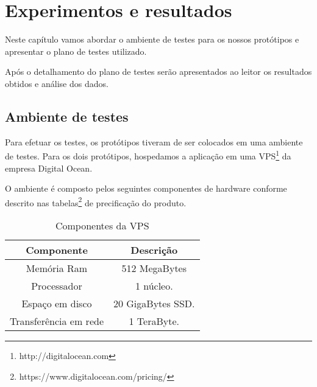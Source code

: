
\chapter{Experimentos e resultados}
\label{experimentos-resultados}

\vspace{-1.9cm}


 Neste capítulo vamos abordar o ambiente de testes para os nossos protótipos e apresentar 
 o plano de testes utilizado.
 
 Após o detalhamento do plano de testes serão apresentados ao leitor os resultados obtidos e análise dos dados.

\section{Ambiente de testes}
\label{ambientedetestes}

  Para efetuar os testes, os protótipos tiveram de ser colocados em uma ambiente de testes. 
  Para os dois protótipos, hospedamos a aplicação em uma VPS\footnote{http://digitalocean.com} da empresa Digital Ocean.
  
  O ambiente é composto pelos seguintes componentes de hardware conforme descrito nas tabelas\footnote{https://www.digitalocean.com/pricing/}
  de precificação do produto.
  
  \begin{table}[H]
    \centering
    \footnotesize
    \setlength{\abovecaptionskip}{0pt}
    \setlength{\belowcaptionskip}{0pt}
    \caption[Componentes da VPS]{Componentes da VPS}
    \label{tab:components-digital-ocean-vps}
    \begin{tabular}{c|c}
      \hline \hline
      Componente  &	Descrição \\
      \hline \hline
      Memória Ram & 512 MegaBytes \\
      Processador & 1 núcleo. \\
      Espaço em disco & 20 GigaBytes \ac{SSD}. \\
      Transferência em rede & 1 TeraByte. \\
      \hline \hline
    \end{tabular}
  \end{table}


